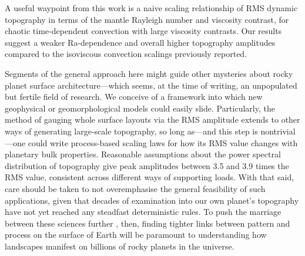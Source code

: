 \documentclass[trackchanges]{aastex63}
\newcommand{\todo}[1]{\textit{\textcolor{violet}{{#1}}}}
\begin{document}

A useful waypoint from this work is a naive scaling relationship of RMS dynamic topography in terms of the mantle Rayleigh number and viscosity contrast, for chaotic time-dependent convection with large viscosity contrasts. Our results suggest a weaker Ra-dependence and overall higher topography amplitudes compared to the isoviscous convection scalings previously reported. %
 





Segments of the general approach here might guide other mysteries about rocky planet surface architecture---which seems, at the time of writing, an unpopulated but fertile field of research. We conceive of a framework into which new geophysical or geomorphological models could easily slide. Particularly, the method of gauging whole surface layouts via the RMS amplitude extends to other ways of generating large-scale topography, so long as---and this step is nontrivial---one could write process-based scaling laws for how its RMS value changes with planetary bulk properties. Reasonable assumptions about the power spectral distribution of topography give peak amplitudes between 3.5 and 3.9 times the RMS value, consistent across different ways of supporting loads. With that said, care should be taken to not overemphasise the general feasibility of such applications, given that decades of examination into our own planet's topography have not yet reached any steadfast deterministic rules. To push the marriage between these sciences further \citep{shorttle_why_2021}, then, finding tighter links between pattern and process on the surface of Earth will be paramount to understanding how landscapes manifest on billions of rocky planets in the universe.
\end{document}
